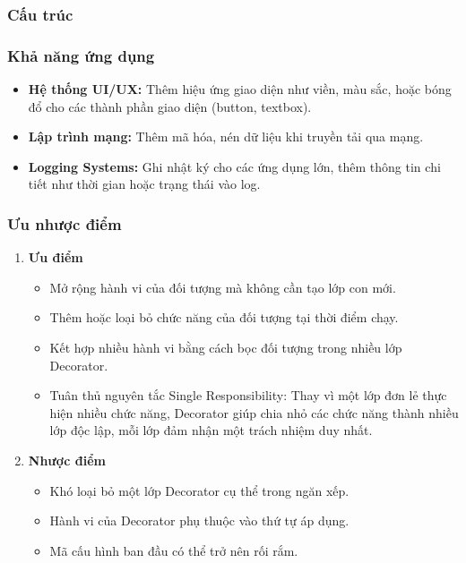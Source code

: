 \subsubsection{Cấu trúc}
\begin{flushleft}

\end{flushleft}

\subsubsection{Khả năng ứng dụng}
\begin{itemize}
    \item \textbf{Hệ thống UI/UX:} Thêm hiệu ứng giao diện như viền, màu sắc, hoặc bóng đổ cho các thành phần giao diện (button, textbox).
    \item \textbf{Lập trình mạng:} Thêm mã hóa, nén dữ liệu khi truyền tải qua mạng.
    \item \textbf{Logging Systems:} Ghi nhật ký cho các ứng dụng lớn, thêm thông tin chi tiết như thời gian hoặc trạng thái vào log.
\end{itemize}

\subsubsection{Ưu nhược điểm}
\begin{enumerate}
    \item \textbf{Ưu điểm}
    \begin{itemize}
        \item Mở rộng hành vi của đối tượng mà không cần tạo lớp con mới.
        \item Thêm hoặc loại bỏ chức năng của đối tượng tại thời điểm chạy.
        \item Kết hợp nhiều hành vi bằng cách bọc đối tượng trong nhiều lớp Decorator.
        \item Tuân thủ nguyên tắc Single Responsibility: Thay vì một lớp đơn lẻ thực hiện nhiều chức năng, Decorator giúp chia nhỏ các chức năng thành nhiều lớp độc lập, mỗi lớp đảm nhận một trách nhiệm duy nhất.
    \end{itemize}
    \item \textbf{Nhược điểm}
    \begin{itemize}
        \item Khó loại bỏ một lớp Decorator cụ thể trong ngăn xếp.
        \item Hành vi của Decorator phụ thuộc vào thứ tự áp dụng.
        \item Mã cấu hình ban đầu có thể trở nên rối rắm.
    \end{itemize}
\end{enumerate}
